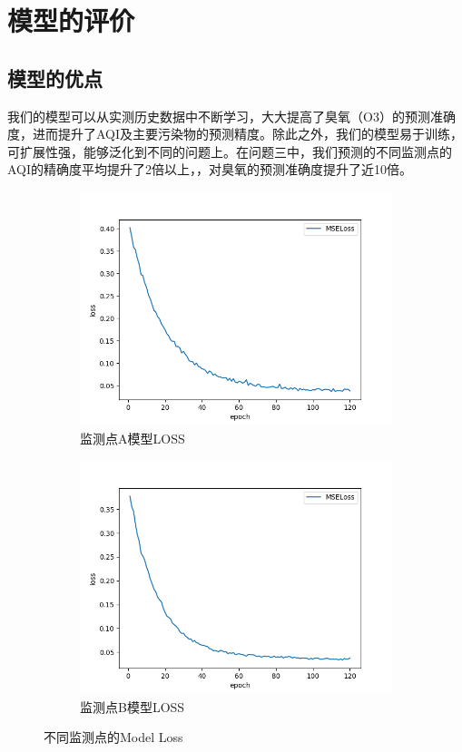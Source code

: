 \documentclass[bwprint]{gmcmthesis}
\numberwithin{figure}{section}
\begin{document}
\section{模型的评价}
\subsection{模型的优点}
我们的模型可以从实测历史数据中不断学习，大大提高了臭氧（O3）的预测准确度，进而提升了AQI及主要污染物的预测精度。除此之外，我们的模型易于训练，可扩展性强，能够泛化到不同的问题上。在问题三中，我们预测的不同监测点的AQI的精确度平均提升了2倍以上，，对臭氧的预测准确度提升了近10倍。
\begin{figure}
	\centering
	\begin{subfigure}[ht]{.3\textwidth}
		\centering
		\includegraphics[width=\textwidth]{figures/model_loss.png}
		\caption{监测点A模型LOSS}
		\label{A_model_loss}
	\end{subfigure}
	\begin{subfigure}[ht]{.3\textwidth}
		\centering
		\includegraphics[width=\textwidth]{figures/model_loss_B.png}
		\caption{监测点B模型LOSS}
		\label{B_model_loss}
	\end{subfigure}
	\caption{不同监测点的Model Loss}
\end{figure}
\end{document}
